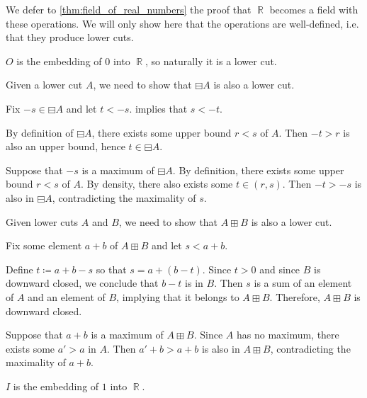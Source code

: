 \begin{defproof}
  We defer to \cref{thm:field_of_real_numbers} the proof that \( \BbbR \) becomes a field with these operations. We will only show here that the operations are well-defined, i.e. that they produce lower cuts.

   \( O \) is the embedding of \( 0 \) into \( \BbbR \), so naturally it is a lower cut.

   Given a lower cut \( A \), we need to show that \( \boxminus A \) is also a lower cut.

   Fix \( -s \in \boxminus A \) and let \( t < -s \).  implies that \( s < -t \).

  By definition of \( \boxminus A \), there exists some upper bound \( r < s \) of \( A \). Then \( -t > r \) is also an upper bound, hence \( t \in \boxminus A \).

   Suppose that \( -s \) is a maximum of \( \boxminus A \). By definition, there exists some upper bound \( r < s \) of \( A \). By density, there also exists some \( t \in (r, s) \). Then \( -t > -s \) is also in \( \boxminus A \), contradicting the maximality of \( s \).

   Given lower cuts \( A \) and \( B \), we need to show that \( A \boxplus B \) is also a lower cut.

   Fix some element \( a + b \) of \( A \boxplus B \) and let \( s < a + b \).

  Define \( t \coloneqq a + b - s \) so that \( s = a + (b - t) \). Since \( t > 0 \) and since \( B \) is downward closed, we conclude that \( b - t \) is in \( B \). Then \( s \) is a sum of an element of \( A \) and an element of \( B \), implying that it belongs to \( A \boxplus B \). Therefore, \( A \boxplus B \) is downward closed.

   Suppose that \( a + b \) is a maximum of \( A \boxplus B \). Since \( A \) has no maximum, there exists some \( a' > a \) in \( A \). Then \( a' + b > a + b \) is also in \( A \boxplus B \), contradicting the maximality of \( a + b \).

   \( I \) is the embedding of \( 1 \) into \( \BbbR \).


\end{defproof}
